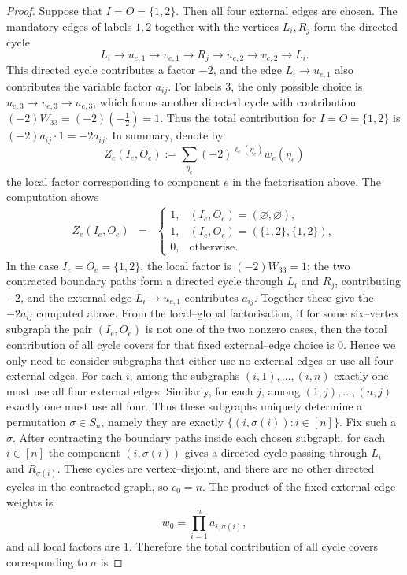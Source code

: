 \documentclass[10pt,a4paper]{amsart}
\begin{document}
\begin{proof}
Suppose that $I=O=\{1,2\}$. Then all four external edges are chosen. The mandatory edges of labels $1,2$ together with the vertices $L_i,R_j$ form the directed cycle
\[
  L_i\to u_{e,1}\to v_{e,1}\to R_j
  \to u_{e,2}\to v_{e,2}\to L_i .
\]
This directed cycle contributes a factor $-2$, and the edge $L_i\to u_{e,1}$ also contributes the variable factor $a_{ij}$. For labels $3$, the only possible choice is $u_{e,3}\to v_{e,3}\to u_{e,3}$, which forms another directed cycle with contribution $(-2)W_{33}=(-2)\left(-\frac12\right)=1$. Thus the total contribution for $I=O=\{1,2\}$ is $(-2)a_{ij}\cdot 1=-2a_{ij}$.
In summary, denote by
\[
  Z_e(I_e,O_e):=\sum_{\eta_e}
  (-2)^{\ell_e(\eta_e)}w_e(\eta_e)
\]
the local factor corresponding to component $e$ in the factorisation above. The computation shows
\begin{eqnarray*}
  Z_e(I_e,O_e)
  &=&\begin{cases}
    1,&(I_e,O_e)=(\varnothing,\varnothing),\\
    1,&(I_e,O_e)=(\{1,2\},\{1,2\}),\\
    0,&\text{otherwise}.
  \end{cases}
\end{eqnarray*}
In the case $I_e=O_e=\{1,2\}$, the local factor is $(-2)W_{33}=1$; the two contracted boundary paths form a directed cycle through $L_i$ and $R_j$, contributing $-2$, and the external edge $L_i\to u_{e,1}$ contributes $a_{ij}$. Together these give the $-2a_{ij}$ computed above. From the local–global factorisation, if for some six–vertex subgraph the pair $(I_e,O_e)$ is not one of the two nonzero cases, then the total contribution of all cycle covers for that fixed external–edge choice is $0$. Hence we only need to consider subgraphs that either use no external edges or use all four external edges.
For each $i$, among the subgraphs $(i,1),\ldots,(i,n)$ exactly one must use all four external edges. Similarly, for each $j$, among $(1,j),\ldots,(n,j)$ exactly one must use all four. Thus these subgraphs uniquely determine a permutation $\sigma\in S_n$, namely they are exactly $\{(i,\sigma(i)):i\in[n]\}$. Fix such a $\sigma$. After contracting the boundary paths inside each chosen subgraph, for each $i\in[n]$ the component $(i,\sigma(i))$ gives a directed cycle passing through $L_i$ and $R_{\sigma(i)}$. These cycles are vertex–disjoint, and there are no other directed cycles in the contracted graph, so $c_0=n$. The product of the fixed external edge weights is
\[
  w_0=\prod_{i=1}^n a_{i,\sigma(i)},
\]
and all local factors are $1$. Therefore the total contribution of all cycle covers corresponding to $\sigma$ is

\end{proof}
\end{document}

